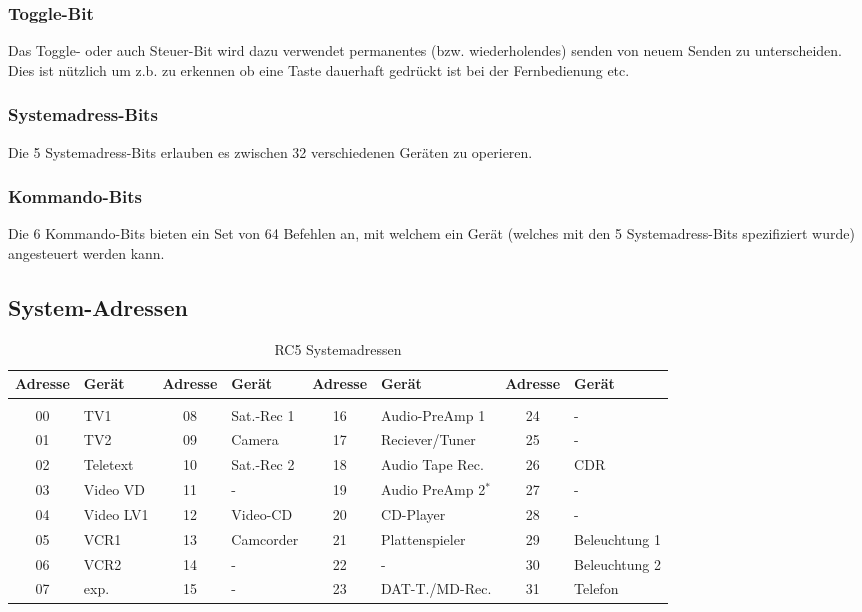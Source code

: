 \subsubsection{Toggle-Bit}
Das Toggle- oder auch Steuer-Bit wird dazu verwendet permanentes (bzw. 
wiederholendes) senden von neuem Senden zu unterscheiden.
Dies ist nützlich um z.b. zu erkennen ob eine Taste dauerhaft gedrückt ist
bei der Fernbedienung etc.
\subsubsection{Systemadress-Bits}
Die 5 Systemadress-Bits erlauben es zwischen 32 verschiedenen Geräten
zu operieren.
\subsubsection{Kommando-Bits}
Die 6 Kommando-Bits bieten ein Set von 64 Befehlen an, mit welchem ein
Gerät (welches mit den 5 Systemadress-Bits spezifiziert wurde) angesteuert
werden kann.

\subsection{System-Adressen}

\begin{table}[h!]
    \footnotesize
    \centering
    \begin{tabular}{c l c l c l c l}
    Adresse & Gerät & Adresse & Gerät & Adresse & Gerät & Adresse & Gerät 
    \\
    \hline &&&&&&& \\
    00      & TV1       & 08 & Sat.-Rec 1   & 16 & Audio-PreAmp 1       & 24 & -                \\
    01      & TV2       & 09 & Camera       & 17 & Reciever/Tuner       & 25 & -                \\
    02      & Teletext  & 10 & Sat.-Rec 2   & 18 & Audio Tape Rec.      & 26 & CDR              \\
    03      & Video VD  & 11 & -            & 19 & Audio PreAmp 2$^*$   & 27 & -                \\
    04      & Video LV1 & 12 & Video-CD     & 20 & CD-Player            & 28 & -                \\
    05      & VCR1      & 13 & Camcorder    & 21 & Plattenspieler       & 29 & Beleuchtung 1    \\
    06      & VCR2      & 14 & -            & 22 & -                    & 30 & Beleuchtung 2    \\
    07      & exp.      & 15 & -            & 23 & DAT-T./MD-Rec.       & 31 & Telefon          \\
    \end{tabular}
    \caption{RC5 Systemadressen}
    \label{tab:rc5_systemadressen}
\end{table}
